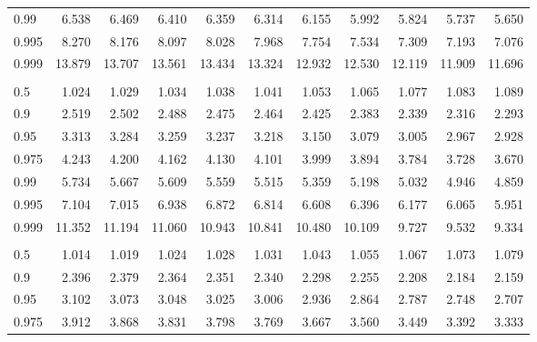 \documentclass[
]{article}
\begin{document}
\begin{table}[H]
\begin{tabular}{lrrrrrrrrrr}
\hspace{1em}0.99 & 6.538 & 6.469 & 6.410 & 6.359 & 6.314 & 6.155 & 5.992 & 5.824 & 5.737 & 5.650\\
\hspace{1em}0.995 & 8.270 & 8.176 & 8.097 & 8.028 & 7.968 & 7.754 & 7.534 & 7.309 & 7.193 & 7.076\\
\hspace{1em}0.999 & 13.879 & 13.707 & 13.561 & 13.434 & 13.324 & 12.932 & 12.530 & 12.119 & 11.909 & 11.696\\
\addlinespace[0.3em]
\multicolumn{11}{l}{\textbf{$k_2=8$}}\\
\hspace{1em}0.5 & 1.024 & 1.029 & 1.034 & 1.038 & 1.041 & 1.053 & 1.065 & 1.077 & 1.083 & 1.089\\
\hspace{1em}0.9 & 2.519 & 2.502 & 2.488 & 2.475 & 2.464 & 2.425 & 2.383 & 2.339 & 2.316 & 2.293\\
\hspace{1em}0.95 & 3.313 & 3.284 & 3.259 & 3.237 & 3.218 & 3.150 & 3.079 & 3.005 & 2.967 & 2.928\\
\hspace{1em}0.975 & 4.243 & 4.200 & 4.162 & 4.130 & 4.101 & 3.999 & 3.894 & 3.784 & 3.728 & 3.670\\
\hspace{1em}0.99 & 5.734 & 5.667 & 5.609 & 5.559 & 5.515 & 5.359 & 5.198 & 5.032 & 4.946 & 4.859\\
\hspace{1em}0.995 & 7.104 & 7.015 & 6.938 & 6.872 & 6.814 & 6.608 & 6.396 & 6.177 & 6.065 & 5.951\\
\hspace{1em}0.999 & 11.352 & 11.194 & 11.060 & 10.943 & 10.841 & 10.480 & 10.109 & 9.727 & 9.532 & 9.334\\
\addlinespace[0.3em]
\multicolumn{11}{l}{\textbf{$k_2=9$}}\\
\hspace{1em}0.5 & 1.014 & 1.019 & 1.024 & 1.028 & 1.031 & 1.043 & 1.055 & 1.067 & 1.073 & 1.079\\
\hspace{1em}0.9 & 2.396 & 2.379 & 2.364 & 2.351 & 2.340 & 2.298 & 2.255 & 2.208 & 2.184 & 2.159\\
\hspace{1em}0.95 & 3.102 & 3.073 & 3.048 & 3.025 & 3.006 & 2.936 & 2.864 & 2.787 & 2.748 & 2.707\\
\hspace{1em}0.975 & 3.912 & 3.868 & 3.831 & 3.798 & 3.769 & 3.667 & 3.560 & 3.449 & 3.392 & 3.333\\

\end{tabular}
\end{table}
\end{document}
